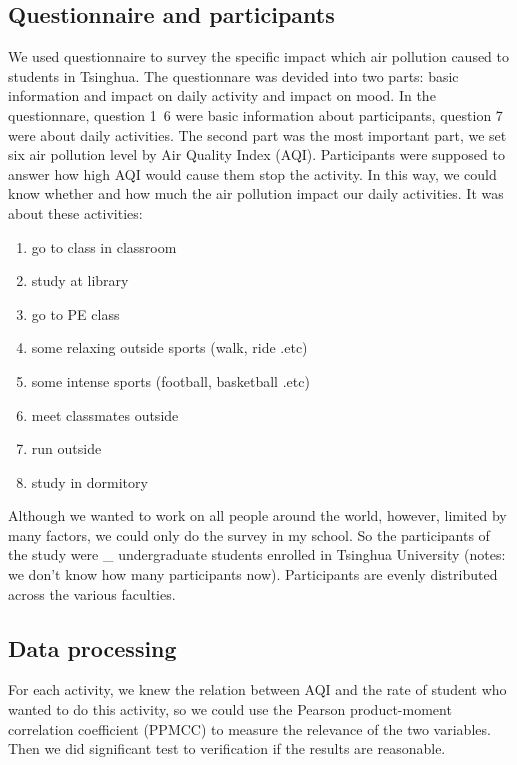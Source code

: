 \subsection{Questionnaire and participants}
We used questionnaire to survey the specific impact which air pollution caused to students in Tsinghua. The questionnare was devided into two parts: basic information and impact on daily activity and impact on mood. In the questionnare, question 1~6 were basic information about participants, question 7 were about daily activities. The second part was the most important part, we set six air pollution level by Air Quality Index (AQI). Participants were supposed to answer how high AQI would cause them stop the activity. In this way, we could know whether and how much the air pollution impact our daily activities. It was about these activities:

\begin{enumerate}
\item go to class in classroom
\item study at library
\item go to PE class
\item some relaxing outside sports (walk, ride .etc)
\item some intense sports (football, basketball .etc)
\item meet classmates outside
\item run outside
\item study in dormitory
\end{enumerate}

Although we wanted to work on all people around the world, however, limited by many factors, we could only do the survey in my school. So the participants of the study were \_ undergraduate students enrolled in Tsinghua University (notes: we don't know how many participants now). Participants are evenly distributed across the various faculties.

\subsection{Data processing}
For each activity, we knew the relation between AQI and the rate of student who wanted to do this activity, so we could use the Pearson product-moment correlation coefficient (PPMCC) to measure the relevance of the two variables. Then we did significant test to verification if the results are reasonable.